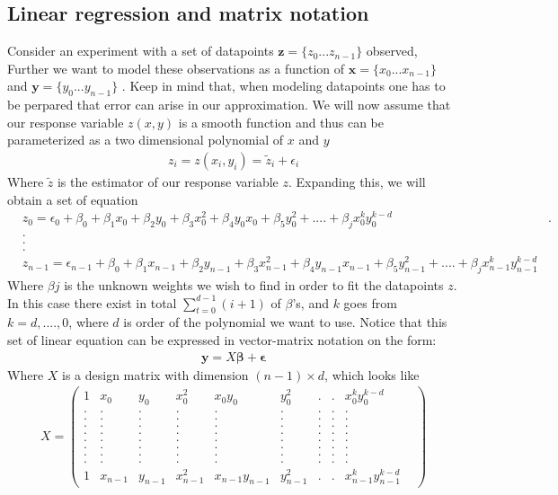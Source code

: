 \documentclass[a4paper, 10pt]{article}
\begin{document}
\subsection{Linear regression and matrix notation} Consider an experiment with a set of datapoints $\mathbf{z} = \{z_{0}...z_{n-1}\}$ observed, Further we want to model these observations as a function of $\mathbf{x} = \{x_{0}...x_{n-1}\}$ and $\mathbf{y} = \{y_{0}...y_{n-1}\}$ . Keep in mind that, when modeling datapoints one has to be perpared that error can arise in our approximation. We will now assume that our response variable $z(x,y)$ is a smooth function and thus can be parameterized as a two dimensional polynomial of $x$ and $y$
\begin{align}
  z_{i} = z(x_{i},y_{i}) = \tilde{z}_{i} + \epsilon_{i}
\end{align}
Where $\tilde{z}$ is the estimator of our response variable $z$. Expanding this, we will obtain a set of equation
\begin{align*}
  & z_{0} = \epsilon_{0} + \beta_{0} + \beta_{1}x_{0} + \beta_{2}y_{0} + \beta_{3}x_{0}^{2}+ \beta_{4}y_{0}x_{0} + \beta_{5}y_{0}^{2} + ....
  + \beta_{j}x^{k}_{0}y_{0}^{k-d}
  & .\\
  & .\\
  & .\\
  & .\\
  & z_{n-1} = \epsilon_{n-1} + \beta_{0} + \beta_{1}x_{n-1} + \beta_{2}y_{n-1} + \beta_{3}x_{n-1}^{2} + \beta_{4}y_{n-1}x_{n-1} +\beta_{5}y_{n-1}^{2} +  ....
  + \beta_{j}x^{k}_{n-1}y_{n-1}^{k-d}
\end{align*}
Where $\beta{j}$ is the unknown weights we wish to find in order to fit the datapoints $z$. In this case there exist in total $\sum_{t =
0}^{d-1}(i+1)$ of $\beta$'s, and $k$ goes from $k = d,...., 0$, where $d$ is order of the polynomial we want to use. Notice that this set of linear equation can be expressed in vector-matrix notation on the form:
\begin{align}
  \mathbf{y} = X\boldsymbol{\beta} + \mathbf{\epsilon}
  \label{matrix equation}
\end{align}
Where $X$ is a design matrix with dimension $(n-1)\times d$, which looks like
\begin{align}
  X =
\begin{pmatrix}
  1 & x_{0} & y_{0}& x_{0}^{2} & x_{0}y_{0}  & y_{0}^{2} & . & . &  x_{0}^{k}y_{0}^{k-d}\\
  .& . & .& .& .& .& . & . & .& \\
  .& . & .& .& .& .& . & . & .& \\
  .& . & .& .& .& .& . & . & .& \\
  .& . & .& .& .& .& . & . & .& \\
  .& . & .& .& .& .& . & . & .& \\
  .& . & .& .& .& .& . & . & .& \\
  .& . & .& .& .& .& . & . & .& \\
  .& . & .& .& .& .& . & . & .& \\
    1 & x_{n-1} & y_{n-1} & x_{n-1}^{2} & x_{n-1}y_{n-1} & y_{n-1}^{2} & . & . &  x_{n-1}^{k}y_{n-1}^{k-d}
\end{pmatrix}
\end{align}
\end{document}
